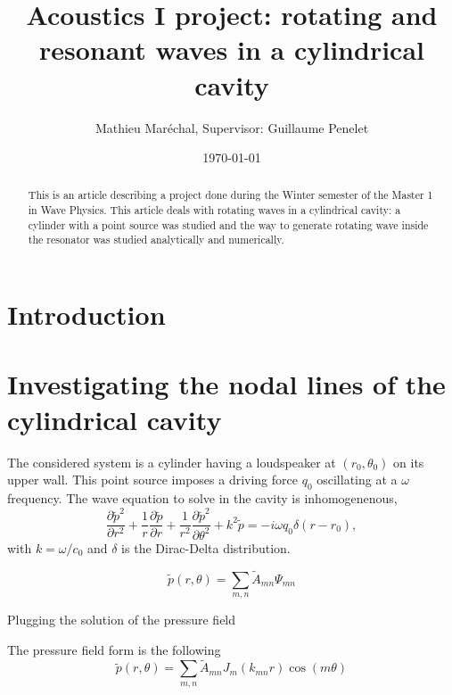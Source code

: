 \documentclass[%
 reprint,
 amsmath,amssymb,
 aps,
]{revtex4-2}
\begin{document}
\title{Acoustics I project: rotating and resonant waves in a cylindrical cavity}
\author{Mathieu Maréchal, Supervisor: Guillaume Penelet}
%
\date{\today}

\begin{abstract}
    This is an article describing a project done during the Winter semester of the Master 1 in Wave Physics. This article deals with rotating waves in a cylindrical cavity: a cylinder with a point source was studied and the way to generate rotating wave inside the resonator was studied analytically and numerically.
\end{abstract}

\maketitle
\section{Introduction}

\section{Investigating the nodal lines of the cylindrical cavity}
    The considered system is a cylinder having a loudspeaker at $(r_0, \theta_0)$ on its upper wall. This point source imposes a driving force $q_0$ oscillating at a $\omega$ frequency. The wave equation to solve in the cavity is inhomogenenous,
\begin{equation}
    \frac{\partial \tilde{p}^2}{\partial r^2} + \frac{1}{r} \frac{\partial \tilde{p}}{\partial r} + \frac{1}{r^2} \frac{\partial \tilde{p}^2}{\partial \theta^2} + k^2 \tilde{p} = -i \omega q_0 \delta(r - r_0),
\end{equation}
with $k = \omega/c_0$ and $\delta$ is the Dirac-Delta distribution.

\begin{equation}
    \tilde{p}(r, \theta) = \sum_{m,n} \tilde{A}_{mn} \Psi_{mn}
\end{equation}



Plugging the solution of the pressure field

The pressure field form is the following 
\begin{equation}
    \tilde{p}(r, \theta) = \sum_{m,n} \tilde{A}_{mn} J_m(k_{mn}r)\cos(m \theta)
\end{equation}
\end{document}
